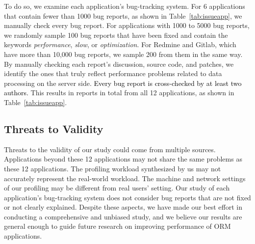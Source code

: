To do so, we examine each application's bug-tracking system. For 6 applications that contain fewer than 1000 bug reports, as shown in Table~\ref{tab:issueapp}, we manually check every bug report. For applications with 1000 to 5000 bug reports, we randomly sample 100 bug reports that have been fixed and contain the keywords \textit{performance}, \textit{slow}, or \textit{optimization}. 
For Redmine and Gitlab, which have more than 10,000 bug reports, we sample 200 from them in the same way. By manually checking each report's discussion, source code, and patches, we identify the ones that truly reflect performance problems related to data processing on the server side. %
\textcolor{black}{
Every bug report is cross-checked by at least two authors.}
This results in \numissues reports in total from all 12 applications, as shown in Table~\ref{tab:issueapp}. 

\subsection{Threats to Validity}
Threats to the validity of our study could come from multiple sources. Applications beyond these 12 applications may not share the same problems as these 12 applications. The profiling workload synthesized by us may not accurately represent the real-world 
workload. The machine and network settings of our profiling may be different from real users' setting.
Our study of each application's bug-tracking system does not consider bug reports that are not fixed or not clearly explained. 
Despite these aspects, we have made our best effort in conducting a comprehensive and unbiased study, and we believe our results are general enough to guide future research on improving performance of ORM applications.


